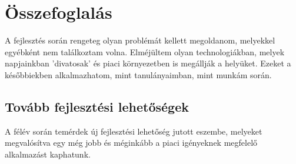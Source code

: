 \chapter{Összefoglalás}

A fejlesztés során rengeteg olyan problémát kellett megoldanom, melyekkel egyébként nem találkoztam volna.
Elméjültem olyan technologiákban, melyek napjainkban 'divatosak' és piaci környezetben is megállják a helyüket.
Ezeket a későbbiekben alkalmazhatom, mint tanulányaimban, mint munkám során.

\section{Tovább fejlesztési lehetőségek}
A félév során temérdek új fejlesztési lehetőség jutott eszembe, melyeket megvalósítva egy még jobb és méginkább a piaci igényeknek megfelelő alkalmazást kaphatunk.
